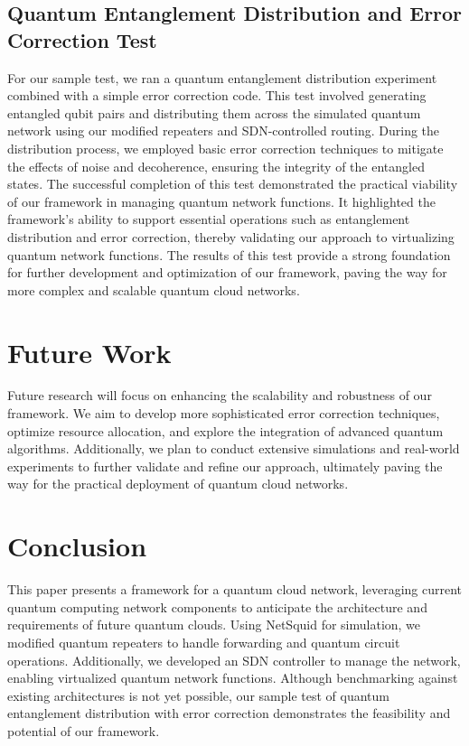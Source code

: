 \documentclass[sigplan,screen]{acmart}
\begin{document}
\subsection{Quantum Entanglement Distribution and Error Correction Test}
For our sample test, we ran a quantum entanglement distribution experiment combined with a simple error correction code. This test involved generating entangled qubit pairs and distributing them across the simulated quantum network using our modified repeaters and SDN-controlled routing. During the distribution process, we employed basic error correction techniques to mitigate the effects of noise and decoherence, ensuring the integrity of the entangled states. The successful completion of this test demonstrated the practical viability of our framework in managing quantum network functions. It highlighted the framework's ability to support essential operations such as entanglement distribution and error correction, thereby validating our approach to virtualizing quantum network functions. The results of this test provide a strong foundation for further development and optimization of our framework, paving the way for more complex and scalable quantum cloud networks.

\section{Future Work}
Future research will focus on enhancing the scalability and robustness of our framework. We aim to develop more sophisticated error correction techniques, optimize resource allocation, and explore the integration of advanced quantum algorithms. Additionally, we plan to conduct extensive simulations and real-world experiments to further validate and refine our approach, ultimately paving the way for the practical deployment of quantum cloud networks.

\section{Conclusion}
This paper presents a framework for a quantum cloud network, leveraging current quantum computing network components to anticipate the architecture and requirements of future quantum clouds. Using NetSquid for simulation, we modified quantum repeaters to handle forwarding and quantum circuit operations. Additionally, we developed an SDN controller to manage the network, enabling virtualized quantum network functions. Although benchmarking against existing architectures is not yet possible, our sample test of quantum entanglement distribution with error correction demonstrates the feasibility and potential of our framework.





\end{document}

